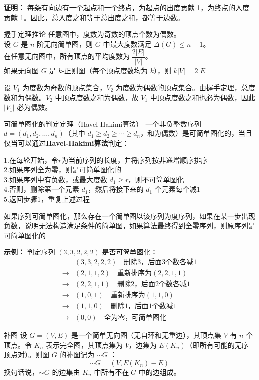 \documentclass[lang=cn,11pt]{elegantbook}
\begin{document}
\textbf{证明：} 每条有向边有一个起点和一个终点，为起点的出度贡献 1，为终点的入度贡献 1。因此，总入度之和等于总出度之和，都等于边数。
\begin{theorem}{握手定理推论}
任意图中，度数为奇数的顶点个数为偶数。\\
设 $G$ 是 $n$ 阶无向简单图，则 $G$ 中最大度数满足 $\Delta(G) \leqslant n-1$。\\
在任意无向图中，所有顶点的平均度数为 $\dfrac{2|E|}{|V|}$。\\
如果无向图 $G$ 是 $k$-正则图（每个顶点度数均为 $k$），则 $k|V| = 2|E|$
\end{theorem}
设 $V_1$ 为度数为奇数的顶点集合，$V_2$ 为度数为偶数的顶点集合。由握手定理，总度数和为偶数。$V_2$ 中顶点度数之和为偶数，故 $V_1$ 中顶点度数之和也必为偶数，因此 $|V_1|$ 必为偶数。

\begin{theorem}{可简单图化的判定定理（Havel-Hakimi算法）}
一个非负整数序列 $d = (d_1, d_2, \ldots, d_n)$（其中 $d_1 \geqslant d_2 \geqslant \cdots \geqslant d_n$，和为偶数）是可简单图化的，当且仅当可以通过\textbf{Havel-Hakimi算法}判定：

1.在每轮开始，令$r$为当前序列的长度，并将序列按非递增顺序排序\\
2.如果序列全为零，则是可简单图化的\\
3.如果序列中有负数，或最大度数 $d_1 \geqslant r$，则不可简单图化\\
4.否则，删除第一个元素 $d_1$，然后将接下来的 $d_1$ 个元素每个减1\\
5.返回步骤1，重复上述过程

如果序列可简单图化，那么存在一个简单图以该序列为度序列，如果在某一步出现负数，说明无法构造满足条件的简单图，如果算法最终得到全零序列，则原序列是可简单图化的
\end{theorem}
\textbf{示例：}
判定序列 $(3, 3, 2, 2, 2)$ 是否可简单图化：
\begin{align*}
& (3, 3, 2, 2, 2) \quad \text{删除3，后面3个数各减1} \\
\to & (2, 1, 1, 2) \quad \text{重新排序为}(2, 2, 1, 1) \\
\to & (2, 2, 1, 1) \quad \text{删除2，后面2个数各减1} \\
\to & (1, 0, 1) \quad \text{重新排序为}(1, 1, 0) \\
\to & (1, 1, 0) \quad \text{删除1，后面1个数减1} \\
\to & (0, 0) \quad \text{全为零，可简单图化}
\end{align*}
\begin{definition}{补图}
设 $G = (V, E)$ 是一个简单无向图（无自环和无重边），其顶点集 $V$ 有 $n$ 个顶点。令 $K_n$ 表示完全图，其顶点集为 $V$，边集为 $E(K_n)$（即所有可能的无序顶点对）。则图 $G$ 的补图记为 $\sim G$ ：
\[
\sim G = (V, E(K_n) -E)
\]
换句话说，$\sim G$ 的边集由 $K_n$ 中所有不在 $G$ 中的边组成。
\end{definition}
\end{document}

